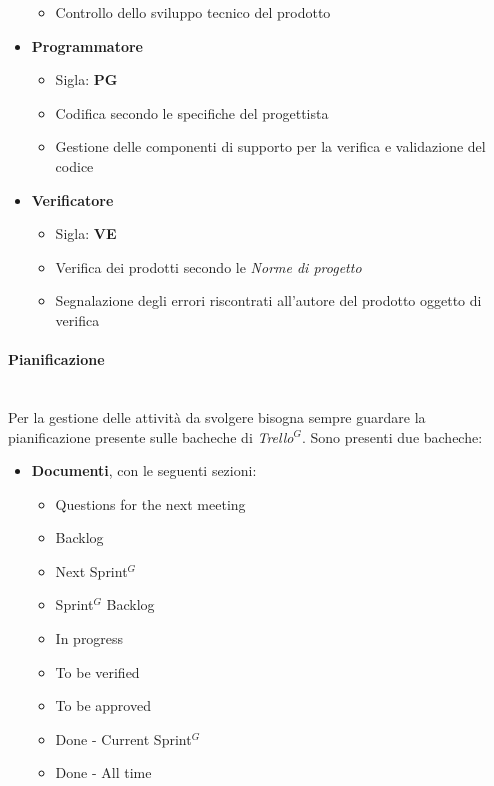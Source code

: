 \begin{itemize}
\begin{itemize}
        \item Controllo dello sviluppo tecnico del prodotto
    \end{itemize}
    \item \textbf{Programmatore}
    \begin{itemize}
        \item Sigla: \textbf{PG}
        \item Codifica secondo le specifiche del progettista
        \item Gestione delle componenti di supporto per la verifica e validazione del codice
    \end{itemize}
    \item \textbf{Verificatore}
    \begin{itemize}
        \item Sigla: \textbf{VE}
        \item Verifica dei prodotti secondo le \textit{Norme di progetto}
        \item Segnalazione degli errori riscontrati all'autore del prodotto oggetto di verifica
    \end{itemize}
\end{itemize}

\paragraph{Pianificazione}
\mbox{}\\
Per la gestione delle attività da svolgere bisogna sempre guardare la pianificazione presente sulle bacheche di \textit{Trello}$^G$.
Sono presenti due bacheche:
\begin{itemize}
    \item \textbf{Documenti}, con le seguenti sezioni:
    \begin{itemize}
        \item Questions for the next meeting
        \item Backlog
        \item Next Sprint$^G$
        \item Sprint$^G$  Backlog
        \item In progress
        \item To be verified
        \item To be approved
        \item Done - Current Sprint$^G$
        \item Done - All time
    \end{itemize}
\end{itemize}

